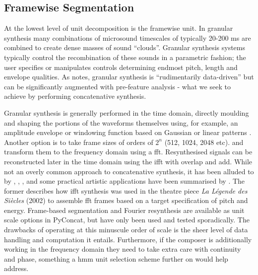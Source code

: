 \subsection{Framewise Segmentation}

At the lowest level of unit decomposition is the framewise unit. In granular synthesis many combinations of microsound timescales of typically 20-200 ms are combined to create dense masses of sound “clouds”. Granular synthesis systems typically control the recombination of these sounds in a parametric fashion; the user specifies or manipulates controls determining endmost pitch, length and envelope qualities. As \cite{Schwarz2003} notes, granular synthesis is “rudimentarily data-driven” but can be significantly augmented with pre-feature analysis - what we seek to achieve by performing concatenative synthesis. 

Granular synthesis is generally performed in the time domain, directly moulding and shaping the portions of the waveforms themselves using, for example, an amplitude envelope or windowing function based on Gaussian or linear patterns \citep{Roads1996, Roads2004}. Another option is to take frame sizes of orders of $2^n$ (512, 1024, 2048 etc). and transform them to the frequency domain using a \acrfull{fft}. Resynthesised signals can be reconstructed later in the time domain using the \acrfull{ifft} with overlap and add. While not an overly common approach to concatenative synthesis, it has been alluded to by \cite{Kobayashi}, \cite{Puckette2004}, \cite{An2012}, and some practical artistic applications have been summarised by \cite{Schwarz2006b}. The former describes how \acrshort{ifft} synthesis was used in the theatre piece \textit{La Légende des Siècles} (2002) to assemble \acrshort{fft} frames based on a target specification of pitch and energy. Frame-based segmentation and Fourier resynthesis are available as unit scale options in PyConcat, but have only been used and tested sporadically. The drawbacks of operating at this minuscule order of scale is the sheer level of data handling and computation it entails. Furthermore, if the composer is additionally working in the frequency domain they need to take extra care with continuity and phase, something a \acrshort{hmm} unit selection scheme further on would help address. 


